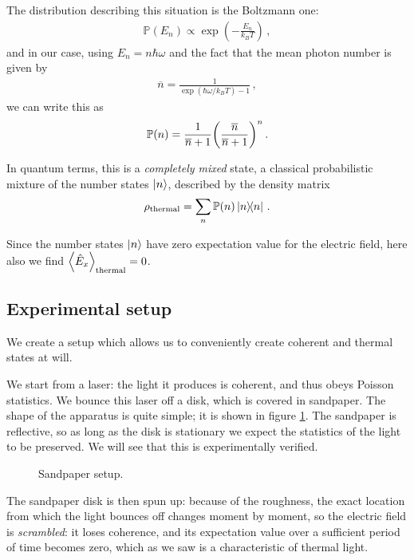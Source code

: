 \documentclass[main.tex]{subfiles}
\begin{document}
The distribution describing this situation is the Boltzmann one: 
%
\begin{align}
\mathbb{P} (E_n) \propto \exp( - \frac{E_n}{k_B T})
\,,
\end{align}
%
and in our case, using \(E_n = n \hbar \omega \) and the fact that the mean photon number is given by 
%
\begin{align}
\overline{n} = \frac{1}{\exp( \hbar \omega  / k_B T) - 1}
\,,
\end{align}
%
we can write this as 
%
\begin{align}
\mathbb{P}(n) = \frac{1}{\overline{n} +1} \qty(\frac{\overline{n}}{\overline{n}+1})^{n}
\,.
\end{align}

In quantum terms, this is a \emph{completely mixed} state, a classical probabilistic mixture of the number states \(\ket{n}\), described by the density matrix 
%
\begin{align}
\rho _{\text{thermal}} = \sum _{n} \mathbb{P}(n) \dyad{n} 
\,.
\end{align}

Since the number states \(\ket{n}\) have zero expectation value for the electric field, here also we find \(\expval{\hat{E}_x}_{\text{thermal}} = 0\). 

\subsection{Experimental setup}

We create a setup which allows us to conveniently create coherent and thermal states at will.

We start from a laser: the light it produces is coherent, and thus obeys Poisson statistics. 
We bounce this laser off a disk, which is covered in sandpaper. The shape of the apparatus is quite simple; it is shown in figure \ref{fig:sandpaper}.  
The sandpaper is reflective, so as long as the disk is stationary we expect the statistics of the light to be preserved. We will see that this is experimentally verified. 

\begin{figure}[ht]
\centering

\caption{Sandpaper setup.}
\label{fig:sandpaper}
\end{figure}

The sandpaper disk is then spun up: because of the roughness, the exact location from which the light bounces off changes moment by moment, so the electric field is \emph{scrambled}: it loses coherence, and its expectation value over a sufficient period of time becomes zero, which as we saw is a characteristic of thermal light.
\end{document}
